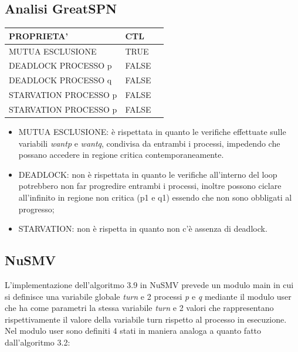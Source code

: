 \documentclass{article}
\begin{document}
\subsection{Analisi GreatSPN}
\begin{tabular}{ |p{6cm}||p{3cm}|p{3cm}|}
 \hline
 PROPRIETA'& CTL\\
 \hline
 MUTUA ESCLUSIONE&TRUE \\
 DEADLOCK PROCESSO p&FALSE \\
 DEADLOCK PROCESSO q&FALSE\\
 STARVATION PROCESSO p&FALSE\\
 STARVATION PROCESSO p&FALSE\\
\hline
\end{tabular}
\begin{itemize}
    \item MUTUA ESCLUSIONE: è rispettata in quanto le verifiche effettuate sulle variabili \textit{wantp} e \textit{wantq}, condivisa da entrambi i processi, impedendo che possano accedere in regione critica contemporaneamente.
    \item DEADLOCK: non è rispettata in quanto le verifiche all'interno del loop potrebbero non far progredire entrambi i processi, inoltre possono ciclare all'infinito in regione non critica (p1 e q1) essendo che non sono obbligati al progresso;
    \item STARVATION: non è rispetta in quanto non c'è assenza di deadlock.
\end{itemize}
\clearpage
\subsection{NuSMV}
L'implementazione dell'algoritmo 3.9 in NuSMV prevede un modulo main in cui si definisce una variabile globale \textit{turn} e 2 processi \textit{p} e \textit{q} mediante il modulo user che ha come parametri la stessa variabile \textit{turn} e 2 valori che rappresentano rispettivamente il valore della variabile turn rispetto al processo in esecuzione. 
\\Nel modulo user sono definiti 4 stati in maniera analoga a quanto fatto dall'algoritmo 3.2:
\end{document}
